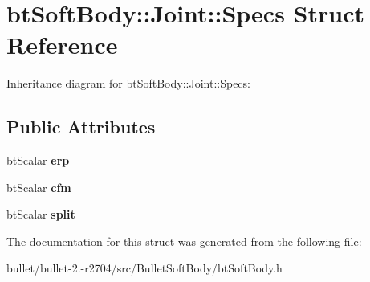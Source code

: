 \hypertarget{structbt_soft_body_1_1_joint_1_1_specs}{\section{bt\+Soft\+Body\+:\+:Joint\+:\+:Specs Struct Reference}
\label{structbt_soft_body_1_1_joint_1_1_specs}
}


Inheritance diagram for bt\+Soft\+Body\+:\+:Joint\+:\+:Specs\+:
\subsection*{Public Attributes}
\begin{DoxyCompactItemize}
\item 
\hypertarget{structbt_soft_body_1_1_joint_1_1_specs_a2128d5e934125f18c31e71baf374d812}{bt\+Scalar {\bfseries erp}}\label{structbt_soft_body_1_1_joint_1_1_specs_a2128d5e934125f18c31e71baf374d812}

\item 
\hypertarget{structbt_soft_body_1_1_joint_1_1_specs_aebc7b3a79c8dfebf22705d65cbfcd179}{bt\+Scalar {\bfseries cfm}}\label{structbt_soft_body_1_1_joint_1_1_specs_aebc7b3a79c8dfebf22705d65cbfcd179}

\item 
\hypertarget{structbt_soft_body_1_1_joint_1_1_specs_a360c67be0277f561281a6f2d69eaed23}{bt\+Scalar {\bfseries split}}\label{structbt_soft_body_1_1_joint_1_1_specs_a360c67be0277f561281a6f2d69eaed23}

\end{DoxyCompactItemize}


The documentation for this struct was generated from the following file\+:\begin{DoxyCompactItemize}
\item 
bullet/bullet-\/2.-\/r2704/src/\+Bullet\+Soft\+Body/bt\+Soft\+Body.\+h\end{DoxyCompactItemize}
